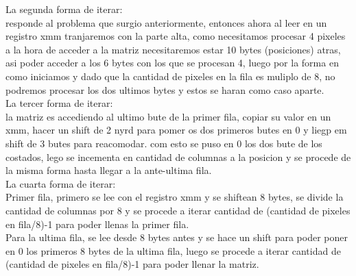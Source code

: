 La segunda forma de iterar:\\ responde al problema que surgio anteriormente, entonces ahora al leer en un registro xmm tranjaremos con la parte alta, como necesitamos procesar 4 pixeles a la hora de acceder a la matriz necesitaremos estar 10 bytes (posiciones) atras, asi poder acceder a los 6 bytes con los que se procesan 4, luego por la forma en como iniciamos y dado que la cantidad de pixeles en la fila es muliplo de 8, no podremos  procesar los dos ultimos bytes y estos se haran como caso aparte.\\

La tercer forma de iterar:\\ la matriz es accediendo al ultimo bute de la primer fila, copiar su valor en un xmm, hacer un shift de 2 nyrd para pomer os dos primeros butes en 0 y liegp em shift de 3 butes para reacomodar. com esto se puso en 0 los dos bute de los costados, lego se incementa en cantidad de columnas a la posicion y se procede de la misma forma hasta llegar a la ante-ultima fila.\\

La cuarta forma de iterar:\\
	Primer fila, primero se lee con el registro xmm y se shiftean 8 bytes, se divide la cantidad de columnas por 8 y se procede a iterar cantidad de (cantidad de pixeles en fila/8)-1 para poder llenas la primer fila.\\
	Para la ultima fila, se lee desde 8 bytes antes y se hace un shift para poder poner en 0 los primeros 8 bytes de la ultima fila, luego se procede a iterar cantidad de (cantidad de pixeles en fila/8)-1 para poder llenar la matriz.\\
